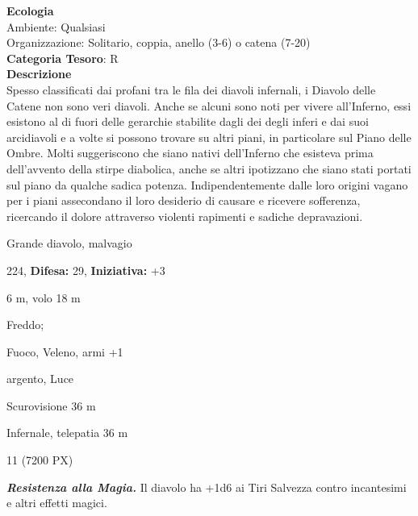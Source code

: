 \begin{multicols}{2}
{\textbf{Ecologia}\\
Ambiente: Qualsiasi\\
Organizzazione: Solitario, coppia, anello (3-6) o catena (7-20)\\
\textbf{Categoria Tesoro}: R\\
\textbf{Descrizione}\\
Spesso classificati dai profani tra le fila dei diavoli infernali, i Diavolo delle Catene non sono veri diavoli. Anche se alcuni sono noti per vivere all'Inferno, essi esistono al di fuori delle gerarchie stabilite dagli dei degli inferi e dai suoi arcidiavoli e a volte si possono trovare su altri piani, in particolare sul Piano delle Ombre. Molti suggeriscono che siano nativi dell'Inferno che esisteva prima dell'avvento della stirpe diabolica, anche se altri ipotizzano che siano stati portati sul piano da qualche sadica potenza. Indipendentemente dalle loro origini vagano per i piani assecondano il loro desiderio di causare e ricevere sofferenza, ricercando il dolore attraverso violenti rapimenti e sadiche depravazioni.

\noindent
\begin{description}[noitemsep, topsep=0pt, parsep=0pt, partopsep=0pt, leftmargin=0cm, labelwidth=2.2cm]
	\item[\textbf{Taglia/Tipo:}] Grande diavolo, malvagio
	\item[\textbf{Caratt.:}] 
	\item[\textbf{Punti Ferita:}] 224,  \textbf{Difesa:} 29,  \textbf{Iniziativa:} +3
	\item[\textbf{Movimento:}] 6 m, volo 18 m
	\item[\textbf{Tiri Salvez.:}] 
	\item[\textbf{Res. Danni:}] Freddo;
	\item[\textbf{Imm. Danni:}] Fuoco, Veleno, armi +1
	\item[\textbf{Vulnerabilità:}] argento, Luce
	\item[\textbf{Sensi:}] Scurovisione 36 m
	\item[\textbf{Linguaggi:}] Infernale, telepatia 36 m
	\item[\textbf{Sfida:}] 11 (7200 PX)\smallskip
\end{description}

\emph{\textbf{Resistenza alla Magia.}} Il diavolo ha +1d6 ai Tiri Salvezza contro incantesimi e altri effetti magici.

}
\end{multicols}
